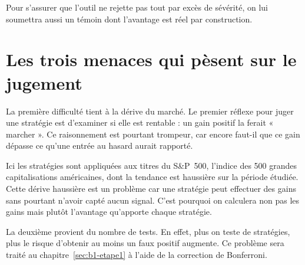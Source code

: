 Pour s'assurer que l'outil ne rejette pas tout par excès de sévérité,
on lui soumettra aussi un témoin dont l'avantage est réel par construction.


\section*{Les trois menaces qui pèsent sur le jugement}
\label{sec:menaces}


La première difficulté tient à la dérive du marché.
Le premier réflexe pour juger une stratégie est d'examiner si elle
est rentable : un gain positif la ferait « marcher ». Ce raisonnement
est pourtant trompeur, car encore faut-il que ce gain dépasse ce
qu'une entrée au hasard aurait rapporté.

Ici les stratégies sont appliquées aux titres du S\&P~500,
l'indice des 500 grandes capitalisations américaines,
dont la tendance est haussière sur la période étudiée.
Cette dérive haussière est un problème car une stratégie peut effectuer
des gains sans pourtant n'avoir capté aucun signal.
C'est pourquoi on calculera non pas les gains mais plutôt l'avantage
qu'apporte chaque stratégie.

La deuxième provient du nombre de tests. En effet,
plus on teste de stratégies, plus le risque d'obtenir au moins un faux
positif augmente. Ce problème sera traité au
chapitre~\ref{sec:b1-etape1} à l'aide de la correction de Bonferroni.

